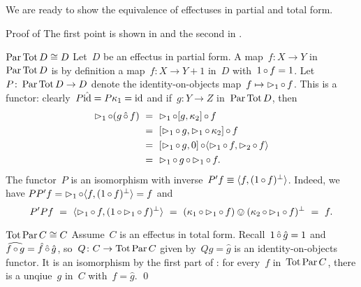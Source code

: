 \documentclass[b]{subfiles}
\begin{document}
\begin{parsec}%
\begin{point}%
We are ready to show the equivalence of effectuses in partial and total form.
\begin{point}{Proof of }%
The first point is shown in 
    and the second in .
\begin{point}{$\operatorname{Par} \operatorname{Tot} D \cong D$}%
Let~$D$ be an effectus in partial form.
A map~$f\colon X \to Y$ in~$\operatorname{Par} \operatorname{Tot} D$
    is by definition a map~$f\colon X \to Y+1$
        in~$D$ with~$1 \mathop{\circ} f= 1$.
Let~$P \colon \operatorname{Par} \operatorname{Tot} D \to D$
    denote the identity-on-objects map~$f \mapsto \mathord{\vartriangleright}_1 \mathop{\circ} f$.
This is a functor: clearly~$P\hat{\operatorname{id}} = P\kappa_1 = \operatorname{id} $ and
    if~$g\colon Y \to Z$ in~$\operatorname{Par}\operatorname{Tot} D$, then
\begin{align*}
    \pproj_1 \after (g \hafter f) & \ = \ 
    \pproj_1 \after [g, \kappa_2] \after f \\
    & \ = \ [\pproj_1 \after g, \pproj_1 \after \kappa_2] \after f \\
    & \ = \ [\pproj_1 \after g,  0] \after 
                \langle \pproj_1 \after f, \pproj_2 \after f\rangle \\
                & \ = \ \pproj_1 \after g  \after \pproj_1 \after f.
\end{align*}
The functor~$P$ is an isomorphism with inverse~$P' f \equiv \langle f, (1 \mathop{\circ} f)^\perp\rangle$.
Indeed, we have
    $P P' f = \mathord{\vartriangleright}_1 \mathop{\circ} \langle f, (1 \mathop{\circ} f)^\perp \rangle = f $
and
\begin{equation*}
    P' P f  \ =\  \langle \pproj_1 \after f, (1 \after \pproj_1 \after f)^\perp\rangle \ =\  (\kappa_1 \after \pproj_1 \after f) \ovee (\kappa_2 \after \pproj_1 \after f)^\perp\ =\  f.
\end{equation*}
\begin{point}{$\operatorname{Tot} \operatorname{Par} C \cong C$}%
Assume~$C$ is an effectus in total form.
Recall~$1 \mathop{\hat\circ} \hat{g} = 1$
and~$\smash{\widehat{f \mathop{\circ} g}} = \hat{f} \mathop{\hat\circ} \hat{g}$,
    so~$Q\colon C \to \operatorname{Tot} \operatorname{Par} C$
    given by~$Q g = \hat{g}$ is an identity-on-objects functor.
It is an isomorphism by the first part of :
    for every~$f$ in~$\operatorname{Tot} \operatorname{Par} C$,
    there is a unqiue~$g$ in~$C$
    with~$f = \hat{g}$. \qed
\end{point}
\end{point}
\end{point}
\end{point}
\end{parsec}
\end{document}
